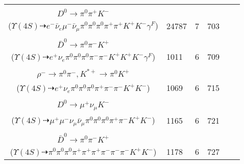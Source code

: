 \documentclass[landscape]{article}
\newcounter{rownumbers}
\newcommand\rn{\stepcounter{rownumbers}\arabic{rownumbers}}
\newcommand{\EOLP}{\\ \hline} %
\newcommand{\topoTags}[1]{#1} %
\begin{document}
\begin{longtable}{clcccc}
\rn & \makecell[l]{ $ 
\Upsilon(4S) \rightarrow B^{+} B^{-} ,
B^{+} \rightarrow \rho^{+} \bar{D}^{0} ,
B^{-} \rightarrow \mu^{-} \bar{\nu}_{\mu} D^{*0} ,
\rho^{+} \rightarrow \pi^{0} \pi^{+} ,
\bar{D}^{0} \rightarrow e^{-} \bar{\nu}_{e} K^{+} \gamma^{F} ,
D^{*0} \rightarrow \pi^{0} D^{0} ,
$ \\ $
D^{0} \rightarrow \pi^{0} \pi^{+} K^{-} 
$ \\ ($
\Upsilon(4S) \dashrightarrow e^{-} \bar{\nu}_{e} \mu^{-} \bar{\nu}_{\mu} \pi^{0} \pi^{0} \pi^{0} \pi^{+} \pi^{+} K^{+} K^{-} \gamma^{F} 
$) } & \topoTags{24787 & }7 & 703 \EOLP

\rn & \makecell[l]{ $ 
\Upsilon(4S) \rightarrow B^{+} B^{-} ,
B^{+} \rightarrow e^{+} \nu_{e} \bar{D}^{*0} \gamma^{F} ,
B^{-} \rightarrow \rho^{-} D^{0} ,
\bar{D}^{*0} \rightarrow \pi^{0} \bar{D}^{0} ,
\rho^{-} \rightarrow \pi^{0} \pi^{-} ,
D^{0} \rightarrow K^{+} K^{-} ,
$ \\ $
\bar{D}^{0} \rightarrow \pi^{0} \pi^{-} K^{+} 
$ \\ ($
\Upsilon(4S) \dashrightarrow e^{+} \nu_{e} \pi^{0} \pi^{0} \pi^{0} \pi^{-} \pi^{-} K^{+} K^{+} K^{-} \gamma^{F} 
$) } & \topoTags{1011 & }6 & 709 \EOLP

\rn & \makecell[l]{ $ 
\Upsilon(4S) \rightarrow B^{+} B^{-} ,
B^{+} \rightarrow e^{+} \nu_{e} \bar{D}^{0} ,
B^{-} \rightarrow \rho^{-} D^{0} ,
\bar{D}^{0} \rightarrow \rho^{-} K^{*+} ,
\rho^{-} \rightarrow \pi^{0} \pi^{-} ,
D^{0} \rightarrow \pi^{+} K^{-} ,
$ \\ $
\rho^{-} \rightarrow \pi^{0} \pi^{-} ,
K^{*+} \rightarrow \pi^{0} K^{+} 
$ \\ ($
\Upsilon(4S) \dashrightarrow e^{+} \nu_{e} \pi^{0} \pi^{0} \pi^{0} \pi^{+} \pi^{-} \pi^{-} K^{+} K^{-} 
$) } & \topoTags{1069 & }6 & 715 \EOLP

\rn & \makecell[l]{ $ 
\Upsilon(4S) \rightarrow B^{+} B^{-} ,
B^{+} \rightarrow \rho^{+} \bar{D}^{0} ,
B^{-} \rightarrow \mu^{-} \bar{\nu}_{\mu} D^{*0} ,
\rho^{+} \rightarrow \pi^{0} \pi^{+} ,
\bar{D}^{0} \rightarrow \pi^{0} \pi^{-} K^{+} ,
D^{*0} \rightarrow \pi^{0} D^{0} ,
$ \\ $
D^{0} \rightarrow \mu^{+} \nu_{\mu} K^{-} 
$ \\ ($
\Upsilon(4S) \dashrightarrow \mu^{+} \mu^{-} \nu_{\mu} \bar{\nu}_{\mu} \pi^{0} \pi^{0} \pi^{0} \pi^{+} \pi^{-} K^{+} K^{-} 
$) } & \topoTags{1165 & }6 & 721 \EOLP

\rn & \makecell[l]{ $ 
\Upsilon(4S) \rightarrow B^{+} B^{-} ,
B^{+} \rightarrow \pi^{0} \pi^{+} \pi^{+} D^{*-} ,
B^{-} \rightarrow \rho^{-} D^{0} ,
D^{*-} \rightarrow \pi^{-} \bar{D}^{0} ,
\rho^{-} \rightarrow \pi^{0} \pi^{-} ,
D^{0} \rightarrow \pi^{+} K^{-} ,
$ \\ $
\bar{D}^{0} \rightarrow \pi^{0} \pi^{-} K^{+} 
$ \\ ($
\Upsilon(4S) \dashrightarrow \pi^{0} \pi^{0} \pi^{0} \pi^{+} \pi^{+} \pi^{+} \pi^{-} \pi^{-} \pi^{-} K^{+} K^{-} 
$) } & \topoTags{1178 & }6 & 727 \EOLP


\end{longtable}
\end{document}
